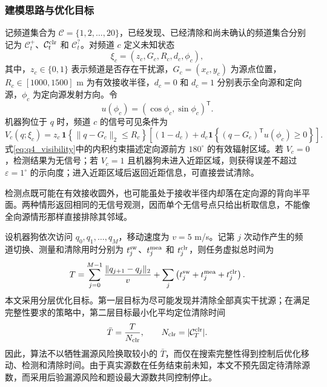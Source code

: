 \documentclass[zihao=-4,a4paper,UTF8,fontset=none]{ctexart}
\begin{document}
\subsubsection{建模思路与优化目标}

记频道集合为 $\mathcal C=\{1,2,\ldots,20\}$，已经发现、已经清除和尚未确认的频道集合分别记为 $\mathcal C_t^{+}$、$\mathcal C_t^{\rm clr}$ 和 $\mathcal C_t^{?}$。对频道 $c$ 定义未知状态
\begin{equation}
\xi_c=(z_c,G_c,R_c,d_c,\phi_c),
\label{eq:q4_state}
\end{equation}
其中，$z_c\in\{0,1\}$ 表示频道是否存在干扰源，$G_c=(x_c,y_c)$ 为源点位置，$R_c\in[1000,1500]$ m 为有效接收半径，$d_c=0$ 和 $d_c=1$ 分别表示全向源和定向源，$\phi_c$ 为定向源发射方向。令
\[
u(\phi_c)=(\cos\phi_c,\sin\phi_c)^{\mathsf T}.
\]
机器狗位于 $q$ 时，频道 $c$ 的信号可见条件为
\begin{equation}
V_c(q;\xi_c)=z_c\,
\mathbf 1\!\left\{\|q-G_c\|_2\le R_c\right\}
\left[(1-d_c)+d_c\mathbf 1\!\left\{(q-G_c)^{\mathsf T}u(\phi_c)\ge0\right\}\right].
\label{eq:q4_visibility}
\end{equation}
式\eqref{eq:q4_visibility}中的内积约束描述定向源前方 $180^\circ$ 的有效辐射区域。若 $V_c=0$，检测结果为无信号；若 $V_c=1$ 且机器狗未进入近距区域，则获得误差不超过 $\varepsilon=1^\circ$ 的示向度；进入近距区域后返回近距信息，可直接尝试清除。

检测点既可能在有效接收圆外，也可能虽处于接收半径内却落在定向源的背向半平面。两种情形返回相同的无信号观测，因而单个无信号点只给出析取信息，不能像全向源情形那样直接排除其邻域。

设机器狗依次访问 $q_0,q_1,\ldots,q_M$，移动速度为 $v=5$ m/s。记第 $j$ 次动作产生的频道切换、测量和清除用时分别为 $t_j^{\rm sw}$、$t_j^{\rm mea}$ 和 $t_j^{\rm clr}$，则任务虚拟总时间为
\begin{equation}
T=\sum_{j=0}^{M-1}\frac{\|q_{j+1}-q_j\|_2}{v}
+\sum_j\left(t_j^{\rm sw}+t_j^{\rm mea}+t_j^{\rm clr}\right).
\label{eq:q4_time}
\end{equation}
本文采用分层优化目标。第一层目标为尽可能发现并清除全部真实干扰源；在满足完整性要求的策略中，第二层目标最小化平均定位清除时间
\begin{equation}
\bar T=\frac{T}{N_{\rm clr}},
\qquad N_{\rm clr}=|\mathcal C_T^{\rm clr}|.
\label{eq:q4_average_time}
\end{equation}
因此，算法不以牺牲漏源风险换取较小的 $\bar T$，而仅在搜索完整性得到控制后优化移动、检测和清除时间。由于真实源数在任务结束前未知，本文不预先固定待清除源数，而采用后验漏源风险和题设最大源数共同控制停止。
\end{document}
